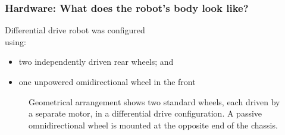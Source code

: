 \documentclass[aspectratio=169]{beamer}
\begin{document}

\begin{frame}
\frametitle{Hardware: What does the robot's body look like?}
\begin{minipage}{0.45\textwidth}
Differential drive robot was configured\\ using:
\begin{itemize}
\item two independently driven rear wheels; and
\item one unpowered omidirectional wheel in the front
\end{itemize}
\begin{figure}
\centering
{}
\end{figure}
\end{minipage}
\hspace{1cm}
\begin{minipage}{0.45\textwidth}
\begin{figure}
\centering
{}
\caption{Geometrical arrangement shows two standard wheels, each driven by a separate motor, in a differential drive configuration. A passive omnidirectional wheel is mounted at the opposite end of the chassis.}
\end{figure}
\end{minipage}
\end{frame}

\end{document}
